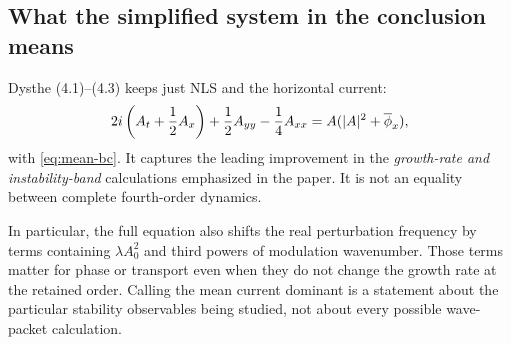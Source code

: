 \subsection{What the simplified system in the conclusion means}
Dysthe (4.1)--(4.3) keeps just NLS and the horizontal current:
\begin{equation}\label{eq:simplified}
 2i\left(A_t+\frac12A_x\right)
 +\frac12A_{yy}-\frac14A_{xx}
 =A(|A|^2+\overline{\phi}_x),
\end{equation}
with \eqref{eq:mean-bc}. It captures the leading improvement in the
\emph{growth-rate and instability-band} calculations emphasized in the
paper. It is not an equality between complete fourth-order dynamics.

In particular, the full equation also shifts the real perturbation
frequency by terms containing $\lambda A_0^2$ and third powers of
modulation wavenumber. Those terms matter for phase or transport even
when they do not change the growth rate at the retained order. Calling
the mean current dominant is a statement about the particular stability
observables being studied, not about every possible wave-packet calculation.

\clearpage
